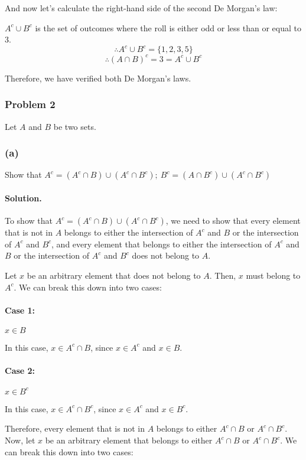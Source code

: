 And now let's calculate the right-hand side of the second De Morgan's law:

$A^c \cup B^c$ is the set of outcomes where the roll is either odd or less than or equal to 3.
$$\therefore A^c \cup B^c = \{1, 2, 3, 5\}$$
$$\therefore (A\cap B)^c = {3} = A^c \cup B^c$$

Therefore, we have verified both De Morgan's laws.

\subsubsection{Problem 2}
Let $A$ and $B$ be two sets.

\subsubsection{(a)} Show that
$A^c = (A^c \cap B) \cup (A^c \cap B^c);\ B^c = (A \cap B^c) \cup (A^c \cap B^c)$
\paragraph{Solution.}
To show that $A^c = (A^c \cap B) \cup (A^c \cap B^c)$, we need to show that every element that is not in $A$ belongs to either the intersection of $A^c$ and $B$ or the intersection of $A^c$ and $B^c$, and every element that belongs to either the intersection of $A^c$ and $B$ or the intersection of $A^c$ and $B^c$ does not belong to $A$.

Let $x$ be an arbitrary element that does not belong to $A$. Then, $x$ must belong to $A^c$. We can break this down into two cases:

\paragraph{Case 1:} $x \in B$

In this case, $x \in A^c \cap B$, since $x \in A^c$ and $x \in B$.

\paragraph{Case 2:} $x \in B^c$

In this case, $x \in A^c \cap B^c$, since $x \in A^c$ and $x \in B^c$.

Therefore, every element that is not in $A$ belongs to either $A^c \cap B$ or $A^c \cap B^c$.
Now, let $x$ be an arbitrary element that belongs to either $A^c \cap B$ or $A^c \cap B^c$.
We can break this down into two cases:

